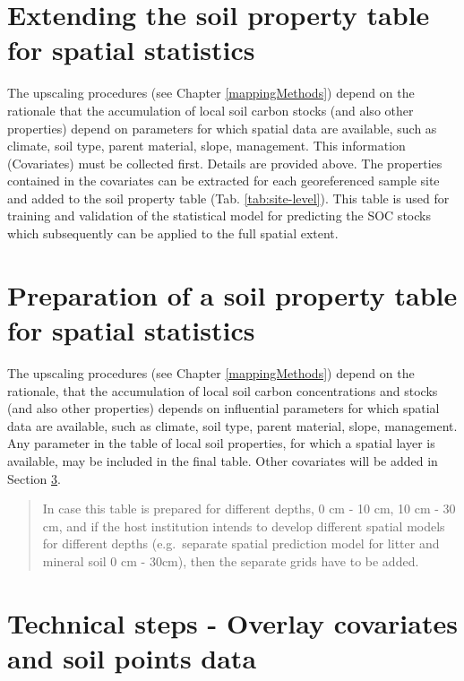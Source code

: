 \documentclass[10pt,b5paper,]{book}
\theoremstyle{definition}
\theoremstyle{definition}
\theoremstyle{definition}
\theoremstyle{remark}
\begin{document}
\hypertarget{extending-the-soil-property-table-for-spatial-statistics}{%
\section{Extending the soil property table for spatial
statistics}\label{extending-the-soil-property-table-for-spatial-statistics}}

The upscaling procedures (see Chapter \ref{mappingMethods}) depend on
the rationale that the accumulation of local soil carbon stocks (and
also other properties) depend on parameters for which spatial data are
available, such as climate, soil type, parent material, slope,
management. This information (Covariates) must be collected first.
Details are provided above. The properties contained in the covariates
can be extracted for each georeferenced sample site and added to the
soil property table (Tab. \ref{tab:site-level}). This table is used for
training and validation of the statistical model for predicting the SOC
stocks which subsequently can be applied to the full spatial extent.

\hypertarget{preparation-of-a-soil-property-table-for-spatial-statistics}{%
\section{Preparation of a soil property table for spatial
statistics}\label{preparation-of-a-soil-property-table-for-spatial-statistics}}

The upscaling procedures (see Chapter \ref{mappingMethods}) depend on
the rationale, that the accumulation of local soil carbon concentrations
and stocks (and also other properties) depends on influential parameters
for which spatial data are available, such as climate, soil type, parent
material, slope, management. Any parameter in the table of local soil
properties, for which a spatial layer is available, may be included in
the final table. Other covariates will be added in Section
\ref{overlay-soil-covariates}.

\begin{quote}
In case this table is prepared for different depths, 0 cm - 10 cm, 10 cm
- 30 cm, and if the host institution intends to develop different
spatial models for different depths (e.g.~separate spatial prediction
model for litter and mineral soil 0 cm - 30cm), then the separate grids
have to be added.
\end{quote}

\hypertarget{overlay-soil-covariates}{%
\section{Technical steps - Overlay covariates and soil points
data}\label{overlay-soil-covariates}}
\end{document}
